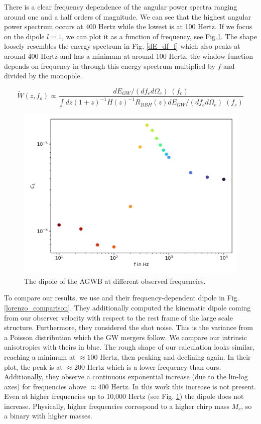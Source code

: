 There is a clear frequency dependence of the angular power spectra ranging around one and a half orders of magnitude. We can see that the highest angular power spectrum occurs at 400 Hertz while the lowest is at 100 Hertz. If we focus on the dipole $l=1$, we can plot it as a function of frequency, see Fig.\ref{dipole_1000Hz}. The shape loosely resembles the energy spectrum in Fig. \ref{dE_df_f} which also peaks at around 400 Hertz and has a minimum at around 100 Hertz. the window function depends on frequency in through this energy spectrum multiplied by $f$ and divided by the monopole.

\begin{equation}
    \tilde{W}(z, f_o)\propto \frac{dE_{GW}/(df_e d\Omega_e)\;(f_e)}{\int dz (1+z)^{-1}H(z)^{-1}R_{BBH}(z) dE_{GW}/(df_e d\Omega_e)\;(f_e)}
\end{equation}

\begin{figure}
    \centering
    \includegraphics[width=0.8\linewidth]{Images/dipole_frequencies_10000Hz.png}
    \caption{The dipole of the AGWB at different observed frequencies.}
    \label{dipole_1000Hz}
\end{figure} 

To compare our results, we use \cite{dallarmi_dipole_2022} and their frequency-dependent dipole in Fig. \ref{lorenzo_comparison}. They additionally computed the kinematic dipole coming from our observer velocity with respect to the rest frame of the large scale structure. Furthermore, they considered the shot noise. This is the variance from a Poisson distribution which the GW mergers follow. We compare our intrinsic anisotropies with theirs in blue. The rough shape of our calculation looks similar, reaching a minimum at $\approx 100$ Hertz, then peaking and declining again. In their plot, the peak is at $\approx 200$ Hertz which is a lower frequency than ours. Additionally, they observe a continuous exponential increase (due to the lin-log axes) for frequencies above $\approx 400$ Hertz. In this work this increase is not present. Even at higher frequencies up to 10,000 Hertz (see Fig. \ref{dipole_1000Hz}) the dipole does not increase. Physically, higher frequencies correspond to a higher chirp mass $M_c$, so a binary with higher masses.

